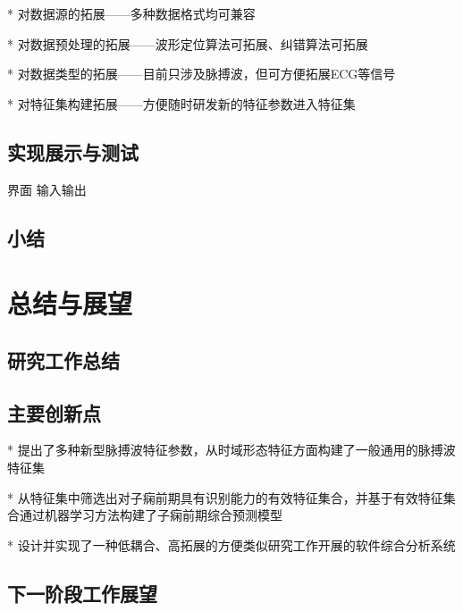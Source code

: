 * 对数据源的拓展——多种数据格式均可兼容

* 对数据预处理的拓展——波形定位算法可拓展、纠错算法可拓展

* 对数据类型的拓展——目前只涉及脉搏波，但可方便拓展ECG等信号

* 对特征集构建拓展——方便随时研发新的特征参数进入特征集

\section{实现展示与测试}
界面
输入输出
\section{小结}

\chapter{总结与展望}
\section{研究工作总结}
\section{主要创新点}
* 提出了多种新型脉搏波特征参数，从时域形态特征方面构建了一般通用的脉搏波特征集

* 从特征集中筛选出对子痫前期具有识别能力的有效特征集合，并基于有效特征集合通过机器学习方法构建了子痫前期综合预测模型

* 设计并实现了一种低耦合、高拓展的方便类似研究工作开展的软件综合分析系统

\section{下一阶段工作展望}



